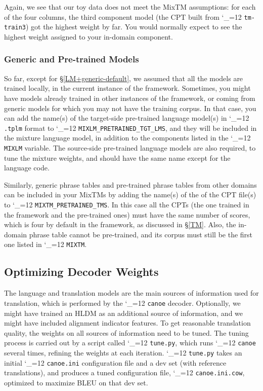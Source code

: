 \documentclass[11pt,letterpaper]{article}
\newcommand{\TODO}[1]{\emph{\textbf{\textcolor{red}{<TODO> #1 </TODO>}}}}
\def\code{\begingroup\catcode`\_=12 \codex}
\newcommand{\codex}[1]{\texttt{#1}\endgroup}
\begin{document}
Again, we see that our toy data does not meet the MixTM assumptions: for each
of the four columns, the third component model (the CPT built from
\code{tm-train3}) got the highest weight by far. You would normally expect to
see the highest weight assigned to your in-domain component.

\subsubsection{Generic and Pre-trained Models} \label{Generic}


So far, except for \S\ref{LM+generic-default}, we assumed that all the models
are trained locally, in the current instance of the framework.  Sometimes, you
might have models already trained in
other instances of the framework, or coming from generic models for which you
may not have the training corpus.  In that case, you can add the name(s) of the
target-side pre-trained language model(s) in \code{.tplm} format to
\code{MIXLM_PRETRAINED_TGT_LMS}, and they will be included in the mixture
language model, in addition to the components listed in the \code{MIXLM}
variable.  The source-side pre-trained language models are also required,
to tune the mixture weights, and should have the same name except for the
language code.


Similarly, generic phrase tables and pre-trained phrase tables from other
domains can be included in your MixTMs by adding the name(s) of the of the CPT
file(s) to \code{MIXTM_PRETRAINED_TMS}.  In this case all the CPTs (the one
trained in the framework and the pre-trained ones) must have the same number of
scores, which is four by default in the framework, as discussed in \S\ref{TM}.
Also, the in-domain phrase table cannot be pre-trained, and its corpus must
still be the first one listed in \code{MIXTM}.

\subsection{Optimizing Decoder Weights} \label{COW}

The language and translation models are the main sources of information used
for translation, which is performed by the \code{canoe} decoder.  Optionally,
we might have trained an HLDM as an additional source of information, and we
might have included alignment indicator features.  To get reasonable
translation quality, the weights on all sources of information
need to be tuned. The tuning process is carried out by a script called
\code{tune.py}, which runs \code{canoe} several times, refining the weights at
each iteration.  \code{tune.py} takes an initial \code{canoe.ini} configuration
file and a dev set (with reference translations), and produces a tuned
configuration file, \code{canoe.ini.cow}, optimized to maximize BLEU on that
dev set.
\end{document}
